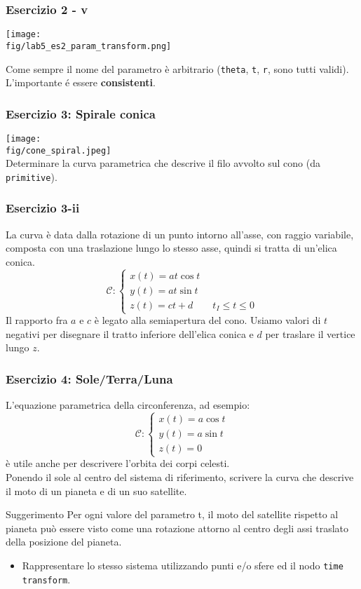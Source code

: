 \documentclass{beamer}
\newcommand{\fig}{figures} %
\begin{document}
\begin{frame}
\frametitle{Esercizio 2 - v}
\begin{center}
\texttt{[image: \\fig/lab5\_es2\_param\_transform.png]}
\end{center}

    Come sempre il nome del parametro \`e arbitrario (\texttt{theta}, \texttt{t}, \texttt{r}, sono tutti validi).
    L'importante \'e essere \textbf{consistenti}.
\end{frame}
%
\begin{frame}
\frametitle{Esercizio 3: Spirale conica}
\texttt{[image: \\fig/cone\_spiral.jpeg]}\\
Determinare la curva parametrica che descrive il filo avvolto sul cono (da \texttt{primitive}). 
\end{frame}
\begin{frame}
\frametitle{Esercizio 3-ii}
La curva \`e data dalla rotazione di un punto intorno all'asse, con raggio
variabile, composta con una traslazione lungo lo stesso asse, quindi si tratta
di un'elica conica.  
\begin{displaymath}
\mathcal{C}:\begin{cases}
 x(t)= at\cos t\\
 y(t)=at \sin t\\
  z(t)= ct + d \qquad t_I\leq t\leq 0
\end{cases}
\end{displaymath}
Il rapporto fra $a$ e $c$ \`e legato alla semiapertura del cono. Usiamo valori
di $t$ negativi per disegnare il tratto inferiore dell'elica conica e $d$ per
traslare il vertice lungo $z$.  
\end{frame}
\begin{frame}
\frametitle{Esercizio 4: Sole/Terra/Luna}
L'equazione parametrica della circonferenza, ad esempio:
\begin{displaymath}
\mathcal{C}:\begin{cases}
 x(t)= a \cos t\\
 y(t)= a \sin t\\
 z(t)= 0
\end{cases}
\end{displaymath}
\`e utile anche per descrivere l'orbita dei corpi celesti. \\
Ponendo il sole al centro del sistema di riferimento, scrivere la curva che descrive il moto di un pianeta e di un suo satellite.\\
\begin{block}{Suggerimento}
Per ogni valore del parametro t, il moto del satellite rispetto al pianeta pu\`o essere visto come una rotazione
attorno al centro degli assi traslato della posizione del pianeta.  
\end{block}
\begin{itemize}
\item Rappresentare lo stesso sistema utilizzando punti e/o sfere ed il nodo \texttt{time transform}.
\end{itemize}
\end{frame}
\end{document}
